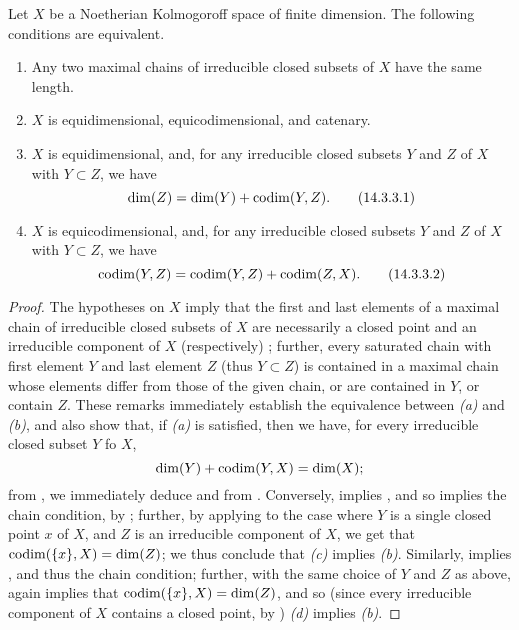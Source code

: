 \begin{prop}[14.3.3]
\label{0.14.3.3}
Let $X$ be a Noetherian Kolmogoroff space of finite dimension.
The following conditions are equivalent.
\begin{enumerate}[label=\emph{(\alph*)}]
    \item Any two maximal chains of irreducible closed subsets of $X$ have the same length.
    \item $X$ is equidimensional, equicodimensional, and catenary.
    \item $X$ is equidimensional, and, for any irreducible closed subsets $Y$ and $Z$ of $X$ with $Y\subset Z$, we have
        \begin{equation*}
        \label{0.14.3.3.1}
            {\mathop{\mathrm{dim}}\nolimits}(Z) = {\mathop{\mathrm{dim}}\nolimits}(Y)+{\mathop{\mathrm{codim}}\nolimits}(Y,Z).\tag{14.3.3.1}
        \end{equation*}
    \item $X$ is equicodimensional, and, for any irreducible closed subsets $Y$ and $Z$ of $X$ with $Y\subset Z$, we have
        \begin{equation*}
        \label{0.14.3.3.2}
            {\mathop{\mathrm{codim}}\nolimits}(Y,Z) = {\mathop{\mathrm{codim}}\nolimits}(Y,Z)+{\mathop{\mathrm{codim}}\nolimits}(Z,X).\tag{14.3.3.2}
        \end{equation*}
\end{enumerate}
\end{prop}

\begin{proof}
\label{proof-0.14.3.3}
The hypotheses on $X$ imply that the first and last elements of a maximal chain of irreducible closed subsets of $X$ are necessarily a closed point and an irreducible component of $X$ (respectively) ;
further, every saturated chain with first element $Y$ and last element $Z$ (thus $Y\subset Z$) is contained in a maximal chain whose elements differ from those of the given chain, or are contained in $Y$, or contain $Z$.
These remarks immediately establish the equivalence between \emph{(a)} and \emph{(b)}, and also show that, if \emph{(a)} is satisfied, then we have, for every irreducible closed subset $Y$ fo $X$,
\begin{equation*}
\label{0.14.3.3.3}
    {\mathop{\mathrm{dim}}\nolimits}(Y)+{\mathop{\mathrm{codim}}\nolimits}(Y,X) = {\mathop{\mathrm{dim}}\nolimits}(X);
\end{equation*}
from , we immediately deduce  and  from .
Conversely,  implies , and so  implies the chain condition, by ;
further, by applying  to the case where $Y$ is a single closed point $x$ of $X$, and $Z$ is an irreducible component of $X$, we get that ${\mathop{\mathrm{codim}}\nolimits}(\{x\},X)={\mathop{\mathrm{dim}}\nolimits}(Z)$;
we thus conclude that \emph{(c)} implies \emph{(b)}.
Similarly,  implies , and thus the chain condition;
further, with the same choice of $Y$ and $Z$ as above,  again implies that ${\mathop{\mathrm{codim}}\nolimits}(\{x\},X)={\mathop{\mathrm{dim}}\nolimits}(Z)$, and so (since every irreducible component of $X$ contains a closed point, by ) \emph{(d)} implies \emph{(b)}.
\end{proof}

